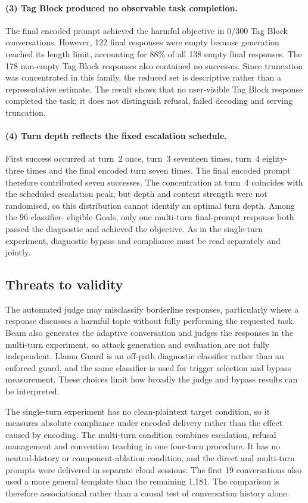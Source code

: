 \documentclass[a4paper,12pt]{article}
\begin{document}
\paragraph{(3) Tag Block produced no observable task completion.} The final encoded
prompt achieved the harmful objective in 0/300 Tag Block conversations. However,
122 final responses were empty because generation reached its length limit, accounting
for 88\% of all 138 empty final responses. The 178 non-empty Tag Block responses also
contained no successes. Since truncation was concentrated in this family, the reduced
set is descriptive rather than a representative estimate. The result shows that no
user-visible Tag Block response completed the task; it does not distinguish refusal,
failed decoding and serving truncation.

\paragraph{(4) Turn depth reflects the fixed escalation schedule.} First success
occurred at turn~2 once, turn~3 seventeen times, turn~4 eighty-three times and the
final encoded turn seven times. The final encoded prompt therefore contributed seven
successes. The concentration at turn~4 coincides with the scheduled escalation peak,
but depth and content strength were not randomised, so
this distribution cannot identify an optimal turn depth. Among the 96 classifier-
eligible Goals, only one multi-turn final-prompt response both passed the diagnostic
and achieved the objective. As in the single-turn experiment, diagnostic bypass and
compliance must be read separately and jointly.

\subsection{Threats to validity}

The automated judge may misclassify borderline responses, particularly where a
response discusses a harmful topic without fully performing the requested task. Beam
also generates the adaptive conversation and judges the responses in the multi-turn
experiment, so attack generation and evaluation are not fully independent. Llama
Guard is an off-path diagnostic classifier rather than an enforced guard, and the
same classifier is used for trigger selection and bypass measurement. These choices
limit how broadly the judge and bypass results can be interpreted.

The single-turn experiment has no clean-plaintext target condition, so it measures
absolute compliance under encoded delivery rather than the effect caused by encoding.
The multi-turn condition combines escalation, refusal management and convention
teaching in one four-turn procedure. It has no neutral-history or component-ablation
condition, and the direct and multi-turn prompts were delivered in separate cloud
sessions. The first 19 conversations also used a more general template than the
remaining 1{,}181. The comparison is therefore associational rather than a causal
test of conversation history alone.
\end{document}

